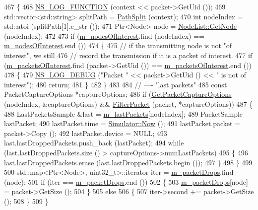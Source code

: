 \begin{DoxyCode}
467 \{
468   \hyperlink{log-macros-disabled_8h_a90b90d5bad1f39cb1b64923ea94c0761}{NS\_LOG\_FUNCTION} (context << packet->GetUid ());
469   std::vector<std::string> splitPath = \hyperlink{pyviz_8cc_abfaec39467cd62b64fb7727503d04d44}{PathSplit} (context);
470   \textcolor{keywordtype}{int} nodeIndex = std::atoi (splitPath[1].c\_str ());
471   Ptr<Node> node = \hyperlink{classns3_1_1NodeList_a80ac09977d48d29db5c704ac8483cf6c}{NodeList::GetNode} (nodeIndex);
472 
473   \textcolor{keywordflow}{if} (\hyperlink{classns3_1_1PyViz_a84239071f012e9f0b3d16c11076f4d63}{m\_nodesOfInterest}.find (nodeIndex) == \hyperlink{classns3_1_1PyViz_a84239071f012e9f0b3d16c11076f4d63}{m\_nodesOfInterest}.end ())
474     \{
475       \textcolor{comment}{// if the transmitting node is not "of interest", we still}
476       \textcolor{comment}{// record the transmission if it is a packet of interest.}
477       \textcolor{keywordflow}{if} (\hyperlink{classns3_1_1PyViz_af922cc7db7145889b2e518e568eac467}{m\_packetsOfInterest}.find (packet->GetUid ()) == 
      \hyperlink{classns3_1_1PyViz_af922cc7db7145889b2e518e568eac467}{m\_packetsOfInterest}.end ())
478         \{
479           \hyperlink{group__logging_ga413f1886406d49f59a6a0a89b77b4d0a}{NS\_LOG\_DEBUG} (\textcolor{stringliteral}{"Packet "} << packet->GetUid () << \textcolor{stringliteral}{" is not of interest"});
480           \textcolor{keywordflow}{return};
481         \}
482     \}
483 
484   \textcolor{comment}{// ---- "last packets"}
485   \textcolor{keyword}{const} PacketCaptureOptions *captureOptions;
486   \textcolor{keywordflow}{if} (\hyperlink{classns3_1_1PyViz_ae78d7025e4dc17203d654789bc9aa829}{GetPacketCaptureOptions} (nodeIndex, &captureOptions) && 
      \hyperlink{classns3_1_1PyViz_ad92f800fa5f75fc22531f572fe38095d}{FilterPacket} (packet, *captureOptions))
487     \{
488       LastPacketsSample &last = \hyperlink{classns3_1_1PyViz_a55366b9119e42eaa283e43b6bc51c464}{m\_lastPackets}[nodeIndex];
489       PacketSample lastPacket;
490       lastPacket.time = \hyperlink{classns3_1_1Simulator_ac3178fa975b419f7875e7105be122800}{Simulator::Now} ();
491       lastPacket.packet = packet->Copy ();
492       lastPacket.device = NULL;
493       last.lastDroppedPackets.push\_back (lastPacket);
494       \textcolor{keywordflow}{while} (last.lastDroppedPackets.size () > captureOptions->numLastPackets)
495         \{
496           last.lastDroppedPackets.erase (last.lastDroppedPackets.begin ());
497         \}
498     \}
499 
500   std::map<Ptr<Node>, uint32\_t>::iterator iter = \hyperlink{classns3_1_1PyViz_ae1e7568a80ebd9e74e2a5b6eb6c5c3c1}{m\_packetDrops}.find (node);
501   \textcolor{keywordflow}{if} (iter == \hyperlink{classns3_1_1PyViz_ae1e7568a80ebd9e74e2a5b6eb6c5c3c1}{m\_packetDrops}.end ())
502     \{
503       \hyperlink{classns3_1_1PyViz_ae1e7568a80ebd9e74e2a5b6eb6c5c3c1}{m\_packetDrops}[node] = packet->GetSize ();
504     \}
505   \textcolor{keywordflow}{else}
506     \{
507       iter->second += packet->GetSize ();
508     \}
509 \}
\end{DoxyCode}


